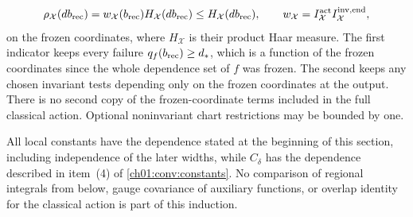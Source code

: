 \begin{theorem}
\begin{enumerate}
\[
 \rho_{\mathcal X}(db_{\mathrm{rec}})=w_{\mathcal X}(b_{\mathrm{rec}})H_{\mathcal X}(db_{\mathrm{rec}})
                  \le H_{\mathcal X}(db_{\mathrm{rec}}),\qquad
 w_{\mathcal X}=I_{\mathcal X}^{\mathrm{act}}
                         I_{\mathcal X}^{\mathrm{inv,end}},
\]
on the frozen coordinates, where $H_{\mathcal X}$ is their product Haar measure. The first indicator keeps every failure $q_f(b_{\mathrm{rec}})\ge d_*$, which is a function of the frozen coordinates since the whole dependence set of $f$ was frozen. The second keeps any chosen invariant tests depending only on the frozen coordinates at the output. There is no second copy of the frozen-coordinate terms included in the full classical action. Optional noninvariant chart restrictions may be bounded by one.
\end{enumerate}
All local constants have the dependence stated at the beginning of this section, including independence of the later widths, while $C_\delta$ has the dependence described in item~(4) of \cref{ch01:conv:constants}. No comparison of regional integrals from below, gauge covariance of auxiliary functions, or overlap identity for the classical action is part of this induction.
\end{theorem}

